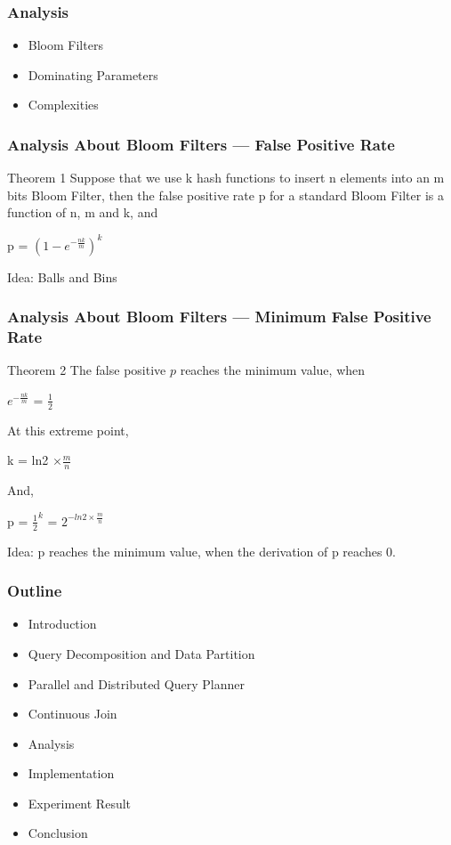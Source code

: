 \begin{frame}
\frametitle{Analysis}
\begin{itemize}
\item Bloom Filters
\item Dominating Parameters
\item Complexities
\end{itemize}
\end{frame}

\begin{frame}
\frametitle{Analysis About Bloom Filters --- False Positive Rate}
\begin{block}{Theorem 1}
Suppose that we use k hash functions to insert n elements into an m bits Bloom Filter, then the false positive rate p for a standard Bloom Filter is a function of n, m and k, and 
\begin{center}
p = $(1-e^{-\frac{nk}{m}})^k$
\end{center}
\end{block}
Idea: Balls and Bins
\end{frame}

\begin{frame}
\frametitle{Analysis About Bloom Filters --- Minimum False Positive Rate}
\vspace{-0.1in}
\begin{block}{Theorem 2}
The false positive $p$ reaches the minimum value, when 
\begin{center}
$e^{-\frac{nk}{m}}$ = $\frac{1}{2}$
\end{center}
At this extreme point, 
\begin{center}
k = ln2 $\times \frac{m}{n}$
\end{center}
And,
\begin{center}
p = $\frac{1}{2}^k$ = $2^{-ln2 \times \frac{m}{n}}$
\end{center}
\end{block}
\vspace{-0.25in}
Idea: p reaches the minimum value, when the derivation of p reaches 0.
\end{frame}



\begin{frame}
\frametitle{Outline}
	\begin{itemize}
		\item Introduction
		\item Query Decomposition and Data Partition
		\item Parallel and Distributed Query Planner
		\item Continuous Join
		\item Analysis
		\item Implementation
		\item \textcolor{blue!20}{Experiment Result}
		\item \textcolor{blue!20}{Conclusion}
	\end{itemize}
\end{frame}


